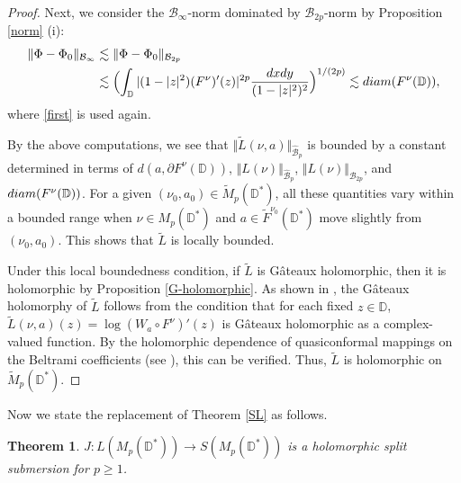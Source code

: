 \documentclass[amstex,12pt,reqno]{amsart}
\newtheorem{theorem}{Theorem}[section]
\theoremstyle{definition}
\begin{document}
\begin{proof}
Next, we consider the ${\mathcal B}_\infty$-norm dominated by ${\mathcal B}_{2p}$-norm 
by Proposition \ref{norm} (i):
\begin{align}
\Vert \Phi-\Phi_0 \Vert_{{\mathcal B}_\infty} &\lesssim \Vert \Phi-\Phi_0 \Vert_{{\mathcal B}_{2p}}\\
&\lesssim \Bigl(\int_{\mathbb D} |(1-|z|^2)(F^\nu)'(z)|^{2p} \frac{dxdy}{(1-|z|^2)^2}\Bigr)^{1/(2p)}
\lesssim {\rm diam}(F^\nu(\mathbb D)),
\end{align}
where \eqref{first} is used again.

By the above computations, we see that $\Vert \widetilde L(\nu,a) \Vert_{\widehat{\mathcal B}_p}$ is bounded 
by a constant
determined in terms of $d(a,\partial F^\nu(\mathbb D))$, $\Vert L(\nu) \Vert_{\widehat{\mathcal B}_p}$, 
$\Vert L(\nu) \Vert_{{\mathcal B}_{2p}}$, and ${\rm diam}(F^\nu(\mathbb D))$.
For a given $(\nu_0,a_0) \in \widetilde M_p(\mathbb D^*)$,
all these quantities vary within a bounded range 
when $\nu \in M_p(\mathbb D^*)$ and $a \in \widetilde F^{\nu_0}(\mathbb D^*)$ move slightly from $(\nu_0,a_0)$.
This shows that $\widetilde L$ is locally bounded.

Under this local boundedness condition, 
if $\widetilde L$ is G\^{a}teaux holomorphic, then it is holomorphic by Proposition \ref{G-holomorphic}.
As shown in \cite[Lemma 6.1]{WM-2}, the G\^{a}teaux holomorphy of $\widetilde L$ follows from the condition that
for each fixed $z \in \mathbb D$,
$\widetilde L(\nu,a)(z)=\log (W_{a} \circ F^{\nu})'(z)$ is 
G\^{a}teaux holomorphic as a complex-valued function. 
By the holomorphic dependence of quasiconformal mappings on the Beltrami coefficients (see \cite[V. Theorem 5]{Ah}),
this can be verified. Thus, $\widetilde L$ is holomorphic on $\widetilde M_p(\mathbb D^*)$.
\end{proof}

Now we state the replacement of Theorem \ref{SL} as follows.

\begin{theorem}\label{bundle}
$J:L(M_p(\mathbb D^*)) \to S(M_p(\mathbb D^*))$ is a holomorphic split submersion for $p \geq 1$. 
\end{theorem}
\end{document}
